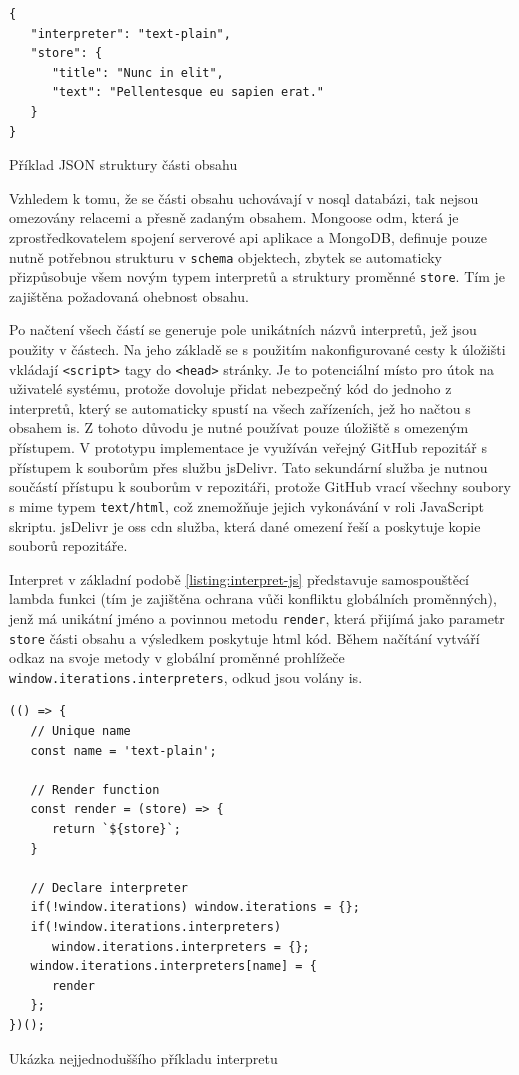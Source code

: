 \begin{fig:code}
	\begin{verbatim}
{
   "interpreter": "text-plain",
   "store": {
      "title": "Nunc in elit",
      "text": "Pellentesque eu sapien erat."
   }
}
   \end{verbatim}
   \caption{Příklad JSON struktury části obsahu}\label{listing:parts-json}
\end{fig:code}

Vzhledem k tomu, že se části obsahu uchovávají v \gls{nosql} databázi, tak nejsou omezovány relacemi a přesně zadaným obsahem. Mongoose \gls{odm}, která je zprostředkovatelem spojení serverové \gls{api} aplikace a MongoDB, definuje pouze nutně potřebnou strukturu v \texttt{schema} objektech, zbytek se automaticky přizpůsobuje všem novým typem interpretů a struktury proměnné \texttt{store}. Tím je zajištěna požadovaná ohebnost obsahu.

Po načtení všech částí se generuje pole unikátních názvů interpretů, jež jsou použity v částech. Na jeho základě se s použitím nakonfigurované cesty k úložišti vkládají \texttt{<script>} tagy do \texttt{<head>} stránky. Je to potenciální místo pro útok na uživatelé systému, protože dovoluje přidat nebezpečný kód do jednoho z interpretů, který se automaticky spustí na všech zařízeních, jež ho načtou s obsahem \gls{is}. Z tohoto důvodu je nutné používat pouze úložiště s omezeným přístupem. V prototypu implementace je využíván veřejný GitHub repozitář s přístupem k souborům přes službu jsDelivr. Tato sekundární služba je nutnou součástí přístupu k souborům v repozitáři, protože \mbox{GitHub} vrací všechny soubory s \gls{mime} typem \texttt{text/html}, což znemožňuje jejich vykonávání v roli JavaScript skriptu. jsDelivr je \gls{oss} \gls{cdn} služba, která dané omezení řeší a poskytuje kopie souborů repozitáře.

Interpret v základní podobě \ref{listing:interpret-js} představuje samospouštěcí lambda funkci (tím je zajištěna ochrana vůči konfliktu globálních proměnných), jenž má unikátní jméno a povinnou metodu \texttt{render}, která přijímá jako parametr \texttt{store} části obsahu a výsledkem poskytuje \gls{html} kód. Během načítání vytváří odkaz na svoje metody v globální proměnné prohlížeče \texttt{window.iterations.interpreters}, odkud jsou volány \gls{is}.

\begin{fig:code}
	\begin{verbatim}
(() => {
   // Unique name
   const name = 'text-plain';

   // Render function
   const render = (store) => {
      return `${store}`;
   }

   // Declare interpreter
   if(!window.iterations) window.iterations = {};
   if(!window.iterations.interpreters) 
      window.iterations.interpreters = {};
   window.iterations.interpreters[name] = {
      render
   };
})();
   \end{verbatim}
   \caption{Ukázka nejjednoduššího příkladu interpretu}\label{listing:interpret-js}
\end{fig:code}


